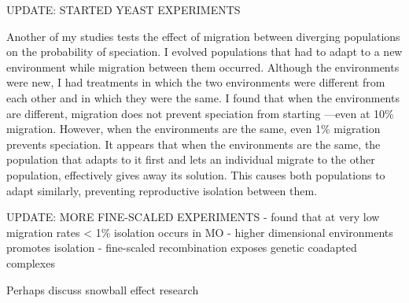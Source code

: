 \documentclass[12pt]{article}
\begin{document}
UPDATE: STARTED YEAST EXPERIMENTS



Another of my studies tests the effect of
migration between diverging populations on the probability of speciation.
%
I evolved populations that had to
adapt to a new environment while
migration between them occurred.
%
Although the environments were new,
I had treatments in which the two environments
were different from each other
and in which they were the same.
%
I found that when the environments are different,
migration does not prevent speciation from starting%
---even at 10\% migration.
%
However, when the environments are the same,
even 1\% migration prevents speciation.
%
It appears that when the environments are the same,
the population that adapts to it first
and lets an individual migrate to the other population,
effectively gives away its solution.
%
This causes both populations to adapt similarly,
preventing reproductive isolation between them.


UPDATE: MORE FINE-SCALED EXPERIMENTS
- found that at very low migration rates < 1\% isolation occurs in MO
- higher dimensional environments promotes isolation
- fine-scaled recombination exposes genetic coadapted complexes


Perhaps discuss snowball effect research
\end{document}
